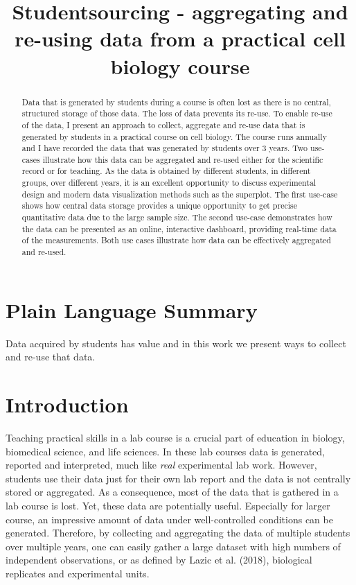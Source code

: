 \documentclass[
]{agujournal2019}
\begin{document}
\title{Studentsourcing - aggregating and re-using data from a practical
cell biology course}



\begin{abstract}
Data that is generated by students during a course is often lost as
there is no central, structured storage of those data. The loss of data
prevents its re-use. To enable re-use of the data, I present an approach
to collect, aggregate and re-use data that is generated by students in a
practical course on cell biology. The course runs annually and I have
recorded the data that was generated by students over 3 years. Two
use-cases illustrate how this data can be aggregated and re-used either
for the scientific record or for teaching. As the data is obtained by
different students, in different groups, over different years, it is an
excellent opportunity to discuss experimental design and modern data
visualization methods such as the superplot. The first use-case shows
how central data storage provides a unique opportunity to get precise
quantitative data due to the large sample size. The second use-case
demonstrates how the data can be presented as an online, interactive
dashboard, providing real-time data of the measurements. Both use cases
illustrate how data can be effectively aggregated and re-used.
\end{abstract}

\section*{Plain Language Summary}
Data acquired by students has value and in this work we present ways to
collect and re-use that data.


\hypertarget{sec-introduction}{%
\section*{Introduction}\label{sec-introduction}}

Teaching practical skills in a lab course is a crucial part of education
in biology, biomedical science, and life sciences. In these lab courses
data is generated, reported and interpreted, much like \emph{real}
experimental lab work. However, students use their data just for their
own lab report and the data is not centrally stored or aggregated. As a
consequence, most of the data that is gathered in a lab course is lost.
Yet, these data are potentially useful. Especially for larger course, an
impressive amount of data under well-controlled conditions can be
generated. Therefore, by collecting and aggregating the data of multiple
students over multiple years, one can easily gather a large dataset with
high numbers of independent observations, or as defined by Lazic et al.
(2018), biological replicates and experimental units.
\end{document}

